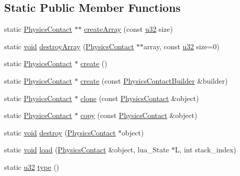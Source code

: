 \subsection*{Static Public Member Functions}
\begin{DoxyCompactItemize}
\item 
static \mbox{\hyperlink{classnjli_1_1_physics_contact}{Physics\+Contact}} $\ast$$\ast$ \mbox{\hyperlink{classnjli_1_1_physics_contact_a4e2f5f156a83e857dbbcdaeabd177190}{create\+Array}} (const \mbox{\hyperlink{_util_8h_a10e94b422ef0c20dcdec20d31a1f5049}{u32}} size)
\item 
static \mbox{\hyperlink{_thread_8h_af1e856da2e658414cb2456cb6f7ebc66}{void}} \mbox{\hyperlink{classnjli_1_1_physics_contact_a5c77ba3e3647f5e71ff0332b6960a5cc}{destroy\+Array}} (\mbox{\hyperlink{classnjli_1_1_physics_contact}{Physics\+Contact}} $\ast$$\ast$array, const \mbox{\hyperlink{_util_8h_a10e94b422ef0c20dcdec20d31a1f5049}{u32}} size=0)
\item 
static \mbox{\hyperlink{classnjli_1_1_physics_contact}{Physics\+Contact}} $\ast$ \mbox{\hyperlink{classnjli_1_1_physics_contact_ab71fc4798c6035544efd00cf20ced421}{create}} ()
\item 
static \mbox{\hyperlink{classnjli_1_1_physics_contact}{Physics\+Contact}} $\ast$ \mbox{\hyperlink{classnjli_1_1_physics_contact_a774cecf47bf21a0a6af2807cf6161f93}{create}} (const \mbox{\hyperlink{classnjli_1_1_physics_contact_builder}{Physics\+Contact\+Builder}} \&builder)
\item 
static \mbox{\hyperlink{classnjli_1_1_physics_contact}{Physics\+Contact}} $\ast$ \mbox{\hyperlink{classnjli_1_1_physics_contact_a9d1f5b1074cee4a7c8edd683c4be9f78}{clone}} (const \mbox{\hyperlink{classnjli_1_1_physics_contact}{Physics\+Contact}} \&object)
\item 
static \mbox{\hyperlink{classnjli_1_1_physics_contact}{Physics\+Contact}} $\ast$ \mbox{\hyperlink{classnjli_1_1_physics_contact_acc8b8748ef094f7d05d3b84b64979136}{copy}} (const \mbox{\hyperlink{classnjli_1_1_physics_contact}{Physics\+Contact}} \&object)
\item 
static \mbox{\hyperlink{_thread_8h_af1e856da2e658414cb2456cb6f7ebc66}{void}} \mbox{\hyperlink{classnjli_1_1_physics_contact_a6e13c908bef23f175dc20d5e5a23d25b}{destroy}} (\mbox{\hyperlink{classnjli_1_1_physics_contact}{Physics\+Contact}} $\ast$object)
\item 
static \mbox{\hyperlink{_thread_8h_af1e856da2e658414cb2456cb6f7ebc66}{void}} \mbox{\hyperlink{classnjli_1_1_physics_contact_a050fd2d4957ae612862b015af09548ad}{load}} (\mbox{\hyperlink{classnjli_1_1_physics_contact}{Physics\+Contact}} \&object, lua\+\_\+\+State $\ast$L, int stack\+\_\+index)
\item 
static \mbox{\hyperlink{_util_8h_a10e94b422ef0c20dcdec20d31a1f5049}{u32}} \mbox{\hyperlink{classnjli_1_1_physics_contact_a417122aab7713317bc18da3d3f6a3bbf}{type}} ()
\end{DoxyCompactItemize}
